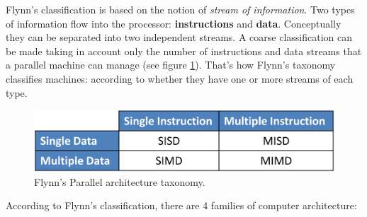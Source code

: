 Flynn's classification is based on the notion of  \textit{stream of information}.
Two types of information flow into the processor: \textbf{instructions} and \textbf{data}.
Conceptually they can be separated into two independent streams. A coarse
classification can be made taking in account only the number of instructions and
 data streams that a parallel machine can manage (see figure \ref{fig:parallelClassification1}).
That's how Flynn's taxonomy classifies machines: according to
whether they have one or more streams of each type.
\begin{figure}
\includegraphics[width=1.0\textwidth]{./images/parallel_programming/parallelClassification}
\caption[Flynn's Parallel architecture taxonomy]{Flynn's Parallel architecture taxonomy.}
\label{fig:parallelClassification1}
\end{figure}
According to Flynn's classification, there are 4 families of computer architecture:
